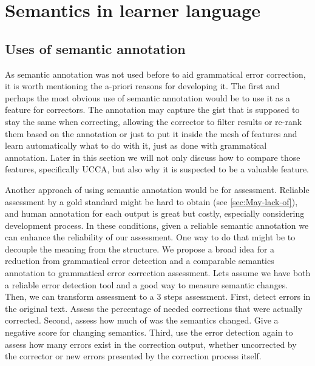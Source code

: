 \documentclass[english]{article}
\begin{document}
\section{Semantics in learner language}

\subsection{Uses of semantic annotation}

As semantic annotation was not used before to aid grammatical error
correction, it is worth mentioning the a-priori reasons for developing
it. The first and perhaps the most obvious use of semantic annotation
would be to use it as a feature for correctors. The annotation may
capture the gist that is supposed to stay the same when correcting,
allowing the corrector to filter results or re-rank them based on
the annotation or just to put it inside the mesh of features and learn
automatically what to do with it, just as done with grammatical annotation.
Later in this section we will not only discuss how to compare those
features, specifically UCCA, but also why it is suspected to be a
valuable feature.

Another approach of using semantic annotation would be for assessment.
Reliable assessment by a gold standard might be hard to obtain (see
\ref{sec:May-lack-of}), and human annotation for each output is great\cite{madnani2011they}
but costly, especially considering development process. In these conditions,
given a reliable semantic annotation we can enhance the reliability
of our assessment. One way to do that might be to decouple the meaning
from the structure. We propose a broad idea for a reduction from grammatical
error detection and a comparable semantics annotation to grammatical
error correction assessment. Lets assume we have both a reliable error
detection tool and a good way to measure semantic changes. Then, we
can transform assessment to a 3 steps assessment. First, detect errors
in the original text. Assess the percentage of needed corrections
that were actually corrected. Second, assess how much of was the semantics
changed. Give a negative score for changing semantics. Third, use
the error detection again to assess how many errors exist in the correction
output, whether uncorrected by the corrector or new errors presented
by the correction process itself. \\
\end{document}
